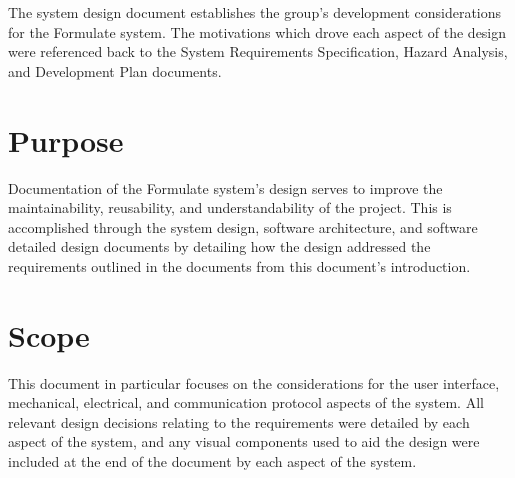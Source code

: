 \documentclass[12pt, titlepage]{article}
\begin{document}
The system design document establishes the group's development considerations for the Formulate system. The motivations which drove each aspect of the design were referenced back to the System Requirements Specification, Hazard Analysis, and Development Plan documents. 


\section{Purpose}



Documentation of the Formulate system's design serves to improve the maintainability, reusability, and understandability of the project. This is accomplished through the system design, software architecture, and software detailed design documents by detailing how the design addressed the requirements outlined in the documents from this document's introduction. \\

\section{Scope}


This document in particular focuses on the considerations for the user interface, mechanical, electrical, and communication protocol aspects of the system. All relevant design decisions relating to the requirements were detailed by each aspect of the system, and any visual components used to aid the design were included at the end of the document by each aspect of the system. \\ 

\newpage
\end{document}
